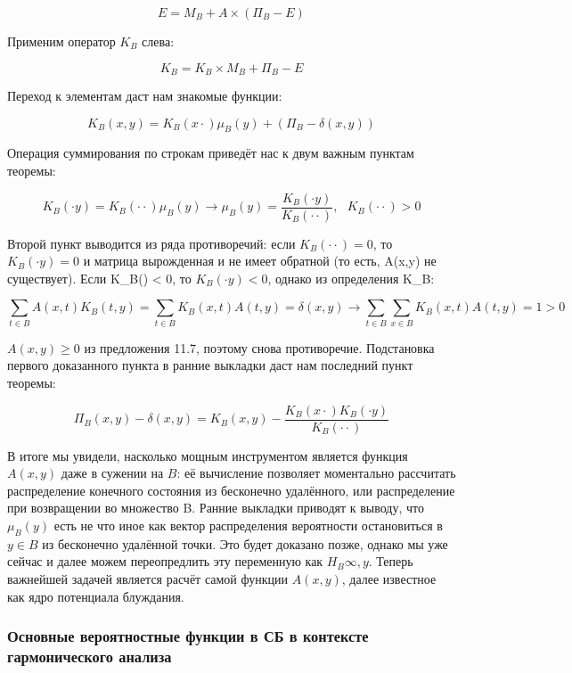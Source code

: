 \[ E = M_B + A \times (\Pi_B - E) \]

Применим оператор $K_B$ слева:

\[ K_B = K_B \times M_B + \Pi_B - E \]

Переход к элементам даст нам знакомые функции:

\[ K_B(x, y) = K_B(x \cdot) \mu_B(y) + (\Pi_B - \delta(x,y))\] 

Операция суммирования по строкам приведёт нас к двум важным пунктам теоремы:

\[ K_B(\cdot y) = K_B(\cdot \cdot) \mu_B(y) \rightarrow \mu_B(y) = \frac{K_B(\cdot y)}{K_B(\cdot \cdot)},\ \ \ K_B(\cdot \cdot) > 0 \]

Второй пункт выводится из ряда противоречий: если $K_B(\cdot \cdot) = 0$, то $K_B(\cdot y) = 0$ и матрица вырожденная и не имеет обратной (то есть, A(x,y) 
не существует). Если K_B(\cdot \cdot) < 0, то $K_B(\cdot y) < 0$, однако из определения K_B: 

\[ \sum_{t \in B} A(x,t) K_B(t,y) = \sum_{t \in B} K_B(x,t) A(t,y) = \delta(x,y) \rightarrow \sum_{t \in B} \sum_{x \in B} K_B(x,t) A(t,y) = 1 > 0 \]

$A(x,y) \geq 0$ из предложения 11.7, поэтому снова противоречие.
Подстановка первого доказанного пункта в ранние выкладки даст нам последний пункт теоремы:

\begin{equation}
\Pi_B(x,y) - \delta(x,y) = K_B(x,y) - \frac{K_B(x \cdot) K_B(\cdot y)}{K_B(\cdot \cdot)}
\label{eq:P_b}
\end{equation}

В итоге мы увидели, насколько мощным инструментом является функция $A(x,y)$ даже в сужении на $B$: её вычисление позволяет моментально рассчитать распределение 
конечного состояния из бесконечно удалённого, или распределение при возвращении во множество B. 
Ранние выкладки приводят к выводу, что $\mu_B(y)$ есть не что иное как вектор распределения вероятности остановиться в $y \in B$ из бесконечно удалённой точки.
Это будет доказано позже, однако мы уже сейчас и далее можем переопредлить эту переменную как $H_B{\infty, y}$. 
Теперь важнейшей задачей является расчёт самой функции $A(x,y)$, далее известное как ядро потенциала блуждания. 

\subsubsection{Основные вероятностные функции в СБ в контексте гармонического анализа}

